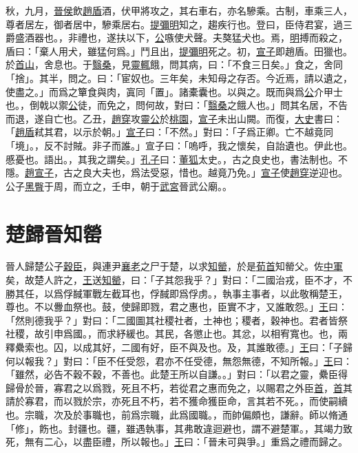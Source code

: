\documentclass{article}
\newcommand{\tsu}{\small\kaishu\color{brown}}
\begin{document}
秋，九月，\uline{晉侯}飲\uline{趙盾}酒，伏甲將攻之，其右{\tsu 車右，亦名驂乘。古制，車乘三人，尊者居左，御者居中，驂乘居右。}\uline{提彌明}知之，趨{\tsu 疾行也。}登曰，臣侍君宴，過三爵{\tsu 盛酒器也。}，非禮也，遂扶以下，\uline{公}嗾{\tsu 使犬聲。}夫獒{\tsu 猛犬也。}焉，\uline{明}搏而殺之，盾曰：「棄人用犬，雖猛何爲。」鬥且出，\uline{提彌明}死之。初，\uline{宣子}{\tsu 即趙盾。}田{\tsu 獵也。}於\uline{首山}，舍{\tsu 息也。}于\uline{翳桑}，見\uline{靈輒}餓，問其病，曰：「不食三日矣。」食之，舍{\tsu 同「捨」。}其半，問之。曰：「宦{\tsu 奴也。}三年矣，未知母之存否。今近焉，請以遺之，使盡之。」而爲之簞食與肉，寘{\tsu 同「置」。}諸橐{\tsu 囊也。}以與之。既而與爲\uline{公}介{\tsu 甲士也。}，倒戟以禦\uline{公}徒，而免之，問何故，對曰：「\uline{翳桑}之餓人也。」問其名居，不告而退，遂自亡也。乙丑，\uline{趙穿}攻\uline{靈公}於\uline{桃園}，\uline{宣子}未出山{\tsu 闕。}而復，\uline{大史}書曰：「\uline{趙盾}弒其君，以示於朝。」\uline{宣子}曰：「不然。」對曰：「子爲正卿。亡不越竟{\tsu 同「境」。}，反不討賊。非子而誰。」宣子曰：「嗚呼，我之懷矣，自詒{\tsu 遺也。}伊{\tsu 此也。}慼{\tsu 憂也。}{\tsu 語出。}，其我之謂矣。」\uline{孔子}曰：\uline{董狐}{\tsu 太史。}，古之良史也，書法{\tsu 制也。}不隱。\uline{趙宣子}，古之良大夫也，爲法受惡，惜也。越竟乃免。」\uline{宣子}使\uline{趙穿}逆{\tsu 迎也。}公子\uline{黑臀}于周，而立之，壬申，朝于\uline{武宮}{\tsu 晉武公廟。}。

\section{楚歸晉知罃}

\noindent{\tsu 成公三年}

晉人歸楚公子\uline{穀臣}，與連尹\uline{襄老}之尸于楚，以求\uline{知罃}，於是\uline{荀首}{\tsu 知罃父。}佐\uline{中軍}矣，故楚人許之，\uline{王}送\uline{知罃}，曰：「子其怨我乎？」對曰：「二國治戎，臣不才，不勝其任，以爲俘馘{\tsu 軍戰左截耳也，俘馘即爲俘虏。}，執事{\tsu 主事者，以此敬稱楚王，尊也。}不以釁{\tsu 血祭也。}鼓，使歸即戮，君之惠也，臣實不才，又誰敢怨。」\uline{王}曰：「然則德我乎？」對曰：「二國圖其社稷{\tsu 社者，土神也；稷者，穀神也。君者皆祭社稷，故引申爲國。}，而求紓{\tsu 緩也。}其民，各懲{\tsu 止也。}其忿，以相宥{\tsu 寬也。}也，兩釋纍{\tsu 索也。}囚，以成其好，二國有好，臣不與{\tsu 及也。}及，其誰敢德。」\uline{王}曰：「子歸何以報我？」對曰：「臣不任受怨，君亦不任受德，無怨無德，不知所報。」\uline{王}曰：「雖然，必告不穀{\tsu 不穀，不善也。此楚王所以自謙。}。」對曰：「以君之靈，纍臣得歸骨於晉，寡君之以爲戮，死且不朽，若從君之惠而免之，以賜君之外臣\uline{首}，\uline{首}其請於寡君，而以戮於宗，亦死且不朽，若不獲命{\tsu 獲臣命，言其若不死。}，而使嗣{\tsu 續也。}宗職，次及於事{\tsu 職也，前爲宗職，此爲國職。}，而帥偏{\tsu 頗也，謙辭。}師以脩{\tsu 通「修」，飭也。}封{\tsu 疆也。}疆，雖遇執事，其弗敢違{\tsu 迴避也，謂不避楚軍。}，其竭力致死，無有二心，以盡臣禮，所以報也。」\uline{王}曰：「晉未可與爭。」重爲之禮而歸之。
\end{document}
